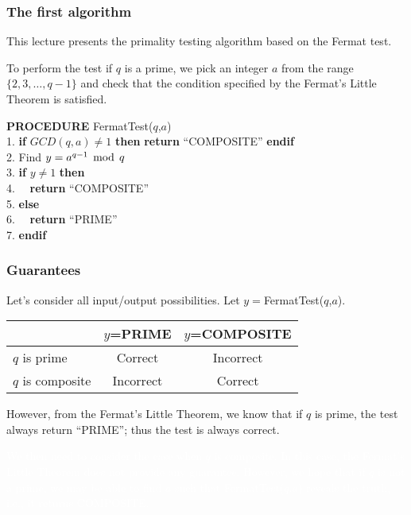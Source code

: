 

\begin{frame}\frametitle{The first algorithm}
  This lecture presents the primality testing algorithm based on the
  Fermat test.

  To perform the test if $q$ is a prime, we pick an integer $a$ from
  the range $\{2,3,\ldots,q-1\}$ and check that the condition
  specified by the Fermat's Little Theorem is satisfied.
  \begin{tcolorbox}
    {\bf PROCEDURE} FermatTest($q$,$a$)\\
    1. {\bf if} $GCD(q,a)\neq 1$ {\bf then} {\bf return} ``COMPOSITE'' {\bf endif}\\
    2. Find $y = a^{q-1}\,\bmod\, q$\\
    3. {\bf if} $y\neq 1$ {\bf then}\\
    4. \ \ {\bf return} ``COMPOSITE''\\
    5. {\bf else}\\
    6. \ \ {\bf return} ``PRIME''\\
    7. {\bf endif}
  \end{tcolorbox}
\end{frame}

\begin{frame}\frametitle{Guarantees}
  Let's consider all input/output possibilities.  Let
  $y=$FermatTest($q$,$a$).

  \vspace{0.1in}
  \begin{tabular}{|l|c|c|}
    \hline
    & $y$=PRIME & $y$=COMPOSITE \\
    \hline
    $q$ is prime & \pause Correct & \pause Incorrect \\
    \hline
    $q$ is composite & \pause Incorrect & \pause Correct \\
    \hline
  \end{tabular}

  \vspace{0.2in} \pause However, from the Fermat's Little Theorem, we
  know that if $q$ is prime, the test always return ``PRIME''; thus
  the test is always correct.

  \textcolor{white}{We then need to consider the case when $q$ is composite.  In
  this case, the Fermat's Little Theorem does not provide any
  guarantee.  However, we hope that if $q$ is not a prime, we may be
  able to find $a$ such that FermatTest($q$,$a$) reveals the truth,
  i.e., it returns COMPOSITE.}
\end{frame}

